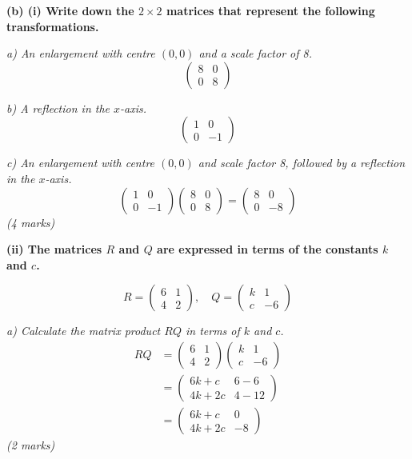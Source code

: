 \documentclass[12pt,a4paper]{article}
\newcommand{\subhead}[1]{\vspace{0.3em}\noindent\textbf{#1}\par}
\newcommand{\qmarks}[1]{\hfill\textit{(#1)}}
\begin{document}
\subhead{(b) (i) Write down the $2\times 2$ matrices that represent the following transformations.}

\textit{a) An enlargement with centre $(0,0)$ and a scale factor of 8.}
\[ \begin{pmatrix} 8 & 0 \\ 0 & 8 \end{pmatrix} \]

\textit{b) A reflection in the $x$-axis.}
\[ \begin{pmatrix} 1 & 0 \\ 0 & -1 \end{pmatrix} \]

\textit{c) An enlargement with centre $(0,0)$ and scale factor 8, followed by a reflection in the $x$-axis.}
\[ \begin{pmatrix} 1 & 0 \\ 0 & -1 \end{pmatrix}\begin{pmatrix} 8 & 0 \\ 0 & 8 \end{pmatrix} = \begin{pmatrix} 8 & 0 \\ 0 & -8 \end{pmatrix} \]
\qmarks{4 marks}

\subhead{(ii) The matrices $R$ and $Q$ are expressed in terms of the constants $k$ and $c$.}
\[ R = \begin{pmatrix} 6 & 1 \\ 4 & 2 \end{pmatrix}, \quad Q = \begin{pmatrix} k & 1 \\ c & -6 \end{pmatrix} \]

\textit{a) Calculate the matrix product $RQ$ in terms of $k$ and $c$.}
\begin{align*}
RQ &= \begin{pmatrix} 6 & 1 \\ 4 & 2 \end{pmatrix}\begin{pmatrix} k & 1 \\ c & -6 \end{pmatrix} \\
&= \begin{pmatrix} 6k + c & 6 - 6 \\ 4k + 2c & 4 - 12 \end{pmatrix} \\
&= \begin{pmatrix} 6k + c & 0 \\ 4k + 2c & -8 \end{pmatrix}
\end{align*}
\qmarks{2 marks}
\end{document}
